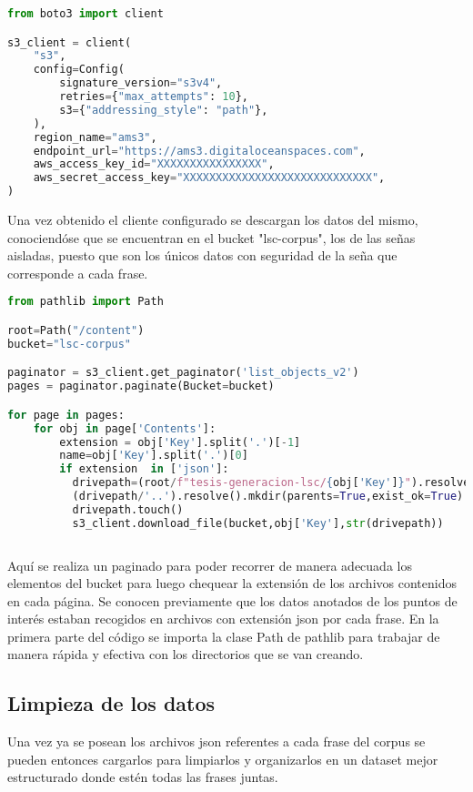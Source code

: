 \vspace{0.5cm}

\begin{lstlisting}[language=Python, caption={Instanciar cliente s3}, label={code:s3client}]
from boto3 import client

s3_client = client(
    "s3",
    config=Config(
        signature_version="s3v4",
        retries={"max_attempts": 10},
        s3={"addressing_style": "path"},
    ),
    region_name="ams3",
    endpoint_url="https://ams3.digitaloceanspaces.com",
    aws_access_key_id="XXXXXXXXXXXXXXXX",
    aws_secret_access_key="XXXXXXXXXXXXXXXXXXXXXXXXXXXXX",
)
\end{lstlisting}

Una vez obtenido el cliente configurado se descargan los datos del mismo, conociendóse que se encuentran en el bucket "lsc-corpus", los de las señas aisladas, puesto que son los únicos datos con seguridad de la seña que corresponde a cada frase.

\vspace{0.5cm}

\begin{lstlisting}[language=Python, caption={Descargar usando el cliente s3}, label={code:download_s3client}]
from pathlib import Path

root=Path("/content")
bucket="lsc-corpus"    

paginator = s3_client.get_paginator('list_objects_v2')
pages = paginator.paginate(Bucket=bucket)

for page in pages:
    for obj in page['Contents']:
        extension = obj['Key'].split('.')[-1]
        name=obj['Key'].split('.')[0]
        if extension  in ['json']:
		  drivepath=(root/f"tesis-generacion-lsc/{obj['Key']}").resolve()
  		  (drivepath/'..').resolve().mkdir(parents=True,exist_ok=True)
  		  drivepath.touch()
  		  s3_client.download_file(bucket,obj['Key'],str(drivepath))
  
\end{lstlisting}
Aquí se realiza un paginado para poder recorrer de manera adecuada  los elementos del bucket para luego chequear la extensión de los archivos contenidos en cada página.
Se conocen previamente que los datos anotados de los puntos de interés estaban recogidos en archivos con extensión json por cada frase. En la primera parte del código se importa la clase Path de pathlib para trabajar de manera rápida y efectiva con los directorios que se van creando.

\subsection{Limpieza de los datos}
Una vez ya se posean los archivos json referentes a cada frase del corpus se pueden entonces cargarlos para limpiarlos y organizarlos en un dataset mejor estructurado donde estén todas las frases juntas.

